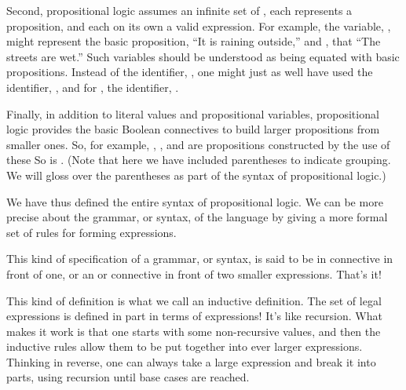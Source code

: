 \documentclass[letterpaper,10pt,english]{sphinxmanual}
\begin{document}
Second, propositional logic assumes an infinite set of , each represents a proposition, and each on its own a valid
expression. For example, the variable, , might represent the basic
proposition, “It is raining outside,” and , that “The streets are
wet.”  Such variables should be understood as being equated with basic
propositions. Instead of the identifier, , one might just as well
have used the identifier, , and for , the
identifier, .

Finally, in addition to literal values and propositional variables,
propositional logic provides the basic Boolean connectives to build
larger propositions from smaller ones. So, for example, , , and  are propositions constructed by the use of these
 So is . (Note that here
we have included parentheses to indicate grouping. We will gloss over
the parentheses as part of the syntax of propositional logic.)

We have thus defined the entire syntax of propositional logic. We
can be more precise about the grammar, or syntax, of the language by
giving a more formal set of rules for forming expressions.

This kind of specification of a grammar, or syntax, is said to be in
 connective in front of one, or an  or 
connective in front of two smaller expressions. That’s it!

This kind of definition is what we call an inductive definition. The
set of legal expressions is defined in part in terms of expressions!
It’s like recursion. What makes it work is that one starts with some
non-recursive  values, and then the inductive rules allow them
to be put together into ever larger expressions. Thinking in reverse,
one can always take a large expression and break it into parts, using
recursion until base cases are reached.
\end{document}
